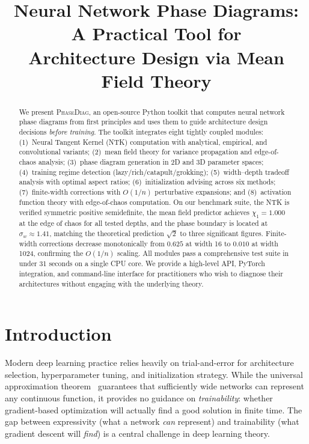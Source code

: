 \documentclass[10pt]{article}
\title{Neural Network Phase Diagrams: A Practical Tool for\\Architecture Design via Mean Field Theory}
\author{}
\date{}
\theoremstyle{definition}
\begin{document}
\maketitle

\begin{abstract}
We present \textsc{PhaseDiag}, an open-source Python toolkit that computes neural network phase diagrams from first principles and uses them to guide architecture design decisions \emph{before training}.
The toolkit integrates eight tightly coupled modules: (1)~Neural Tangent Kernel (NTK) computation with analytical, empirical, and convolutional variants; (2)~mean field theory for variance propagation and edge-of-chaos analysis; (3)~phase diagram generation in 2D and 3D parameter spaces; (4)~training regime detection (lazy/rich/catapult/grokking); (5)~width--depth tradeoff analysis with optimal aspect ratios; (6)~initialization advising across six methods; (7)~finite-width corrections with $O(1/n)$ perturbative expansions; and (8)~activation function theory with edge-of-chaos computation.
On our benchmark suite, the NTK is verified symmetric positive semidefinite, the mean field predictor achieves $\chi_1 = 1.000$ at the edge of chaos for all tested depths, and the phase boundary is located at $\sigma_w \approx 1.41$, matching the theoretical prediction $\sqrt{2}$ to three significant figures.
Finite-width corrections decrease monotonically from $0.625$ at width 16 to $0.010$ at width 1024, confirming the $O(1/n)$ scaling.
All modules pass a comprehensive test suite in under 31 seconds on a single CPU core.
We provide a high-level API, PyTorch integration, and command-line interface for practitioners who wish to diagnose their architectures without engaging with the underlying theory.
\end{abstract}

\section{Introduction}
\label{sec:intro}

Modern deep learning practice relies heavily on trial-and-error for architecture selection, hyperparameter tuning, and initialization strategy.
While the universal approximation theorem~\citep{hornik1989multilayer,cybenko1989approximation} guarantees that sufficiently wide networks can represent any continuous function, it provides no guidance on \emph{trainability}: whether gradient-based optimization will actually find a good solution in finite time.
The gap between expressivity (what a network \emph{can} represent) and trainability (what gradient descent will \emph{find}) is a central challenge in deep learning theory.
\end{document}
